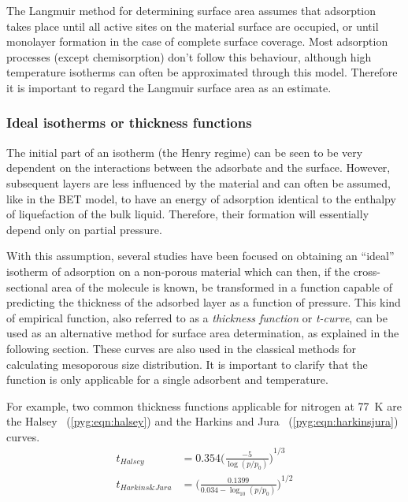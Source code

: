 The Langmuir method for determining surface area assumes that
adsorption takes place until all active sites on the material
surface are occupied, or until monolayer formation in the
case of complete surface coverage. Most adsorption processes
(except chemisorption) don't follow this behaviour, although 
high temperature isotherms can often be approximated through this 
model. Therefore it is important to regard the Langmuir surface 
area as an estimate.

\subsubsection{Ideal isotherms or thickness functions}\label{pyg:charac:tcurve}

The initial part of an isotherm (the Henry regime) can be seen to
be very dependent on the interactions between the adsorbate and the
surface. However, subsequent layers are less influenced by the
material and can often be assumed, like in the \gls{BET} model,
to have an energy of adsorption identical to the enthalpy of liquefaction
of the bulk liquid. Therefore, their formation will essentially depend
only on partial pressure.

With this assumption, several studies have been focused on obtaining
an ``ideal'' isotherm of adsorption on a non-porous material which can
then, if the cross-sectional area of the molecule is known, be transformed
in a function capable of predicting the thickness of the adsorbed layer
as a function of pressure. This kind of empirical function,
also referred to as a \textit{thickness function} or \textit{t-curve},
can be used as an alternative method for surface area determination,
as explained in the following section.
These curves are also used in the classical methods
for calculating mesoporous size distribution. It is important to
clarify that the function is only applicable for a single adsorbent
and temperature.

For example, two common thickness functions applicable for nitrogen
at \SI{77}{\kelvin} are the Halsey~\cite{halseyPhysicalAdsorptionNon1948}
(\autoref{pyg:eqn:halsey}) and the
Harkins and Jura~\cite{harkinsSurfacesSolidsXIII1944}
(\autoref{pyg:eqn:harkinsjura}) curves.
%
\begin{align}
	t_{Halsey}        & = 0.354 {\Big(\frac{-5}{\log(p/p_0)}\Big)}^{1/3}            %
	\label{pyg:eqn:halsey}                                                          \\
	t_{Harkins\&Jura} & = {\Big(\frac{0.1399}{0.034 - \log_{10}(p/p_0)}\Big)}^{1/2} %
	\label{pyg:eqn:harkinsjura}
\end{align}

